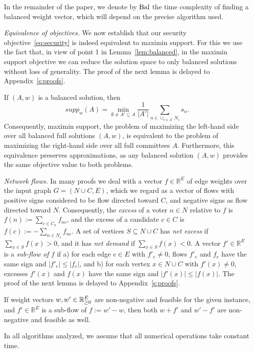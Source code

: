 \begin{remark}\label{rem:bal}
In the remainder of the paper, we denote by $\operatorname{Bal}$ the time complexity of finding a balanced weight vector, which will depend on the precise algorithm used.
\end{remark}

\emph{Equivalence of objectives.} 
We now establish that our security objective~\eqref{eq:security} is indeed equivalent to maximin support. 
For this we use the fact that, in view of point 1 in Lemma~\ref{lem:balanced}, in the maximin support objective we can reduce the solution space to only balanced solutions without loss of generality. The proof of the next lemma is delayed to Appendix~\ref{s:proofs}.

\begin{lemma} \label{lem:equivalence} If $(A,w)$ is a balanced solution, then
$$supp_w(A) = \min_{\emptyset\neq A' \subseteq A} \frac{1}{|A'|} \sum_{n\in \cup_{c\in A'} N_c} s_n.$$
Consequently, maximin support, the problem of maximizing the left-hand side over all balanced full solutions $(A,w)$, 
is equivalent to the problem of maximizing the right-hand side over all full committees $A$. 
Furthermore, this equivalence preserves approximations, as any balanced solution $(A,w)$ provides the same objective value to both problems.
\end{lemma}

\emph{Network flows.}
In many proofs we deal with a vector $f\in\mathbb{R}^{E}$ of edge weights over the input graph $G=(N\cup C,E)$, which we regard as a vector of flows with positive signs considered to be flow directed toward $C$, and negative signs as flow directed toward $N$. 
Consequently, the \emph{excess} of a voter $n\in N$ relative to $f$ is $f(n):=\sum_{c\in C_n} f_{nc}$, and the excess of a candidate $c\in C$ is $f(c):= -\sum_{n\in N_c} f_{nc}$. 
A set of vertices $S\subseteq N\cup C$ has \emph{net excess} if $\sum_{x\in S} f(x)>0$, and it has \emph{net demand} if $\sum_{x\in S} f(x)<0$.    
A vector $f'\in\mathbb{R}^E$ is a \emph{sub-flow of $f$} if a) for each edge $e\in E$ with $f'_e\neq 0$, flows $f'_e$ and $f_e$ have the same sign and $|f'_e|\leq |f_e|$, and b) for each vertex $x\in N\cup C$ with $f'(x)\neq 0$, excesses $f'(x)$ and $f(x)$ have the same sign and $|f'(x)|\leq |f(x)|$. 
The proof of the next lemma is delayed to Appendix~\ref{s:proofs}.

\begin{lemma}\label{lem:subflow}
If weight vectors $w, w'\in\mathbb{R}_{\geq 0}^E$ are non-negative and feasible for the given instance, and $f'\in\mathbb{R}^E$ is a sub-flow of $f:=w'-w$, then both $w+f'$ and $w'-f'$ are non-negative and feasible as well.
\end{lemma}

\begin{remark}
In all algorithms analyzed, we assume that all numerical operations take constant time.
\end{remark}
